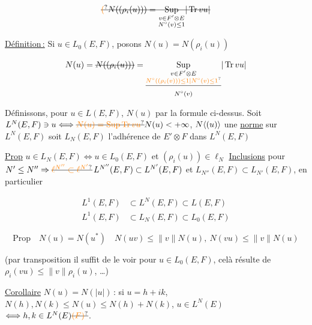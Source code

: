 
\[
\deleted{\unsure{(}N((\rho_i(u)))=\underset{\substack{v\in F'\otimes E\\N^\circ(v)\leq 1}}{\operatorname{Sup}}|\operatorname{Tr}vu|}
\]

\uline{Définition\,:} Si $u\in L_0(E,F)$, posons $N(u)=N(\rho_i(u))$

\[
N(u)=\deleted{N((\rho_i(u)))}=\underset{\substack{v\in F'\otimes E\\\deleted{\unsure{N^\circ((\rho_i(v)))\leq 1|N^\circ(v)\leq1}}\\N^\circ(v)}}{\operatorname{Sup}}|\operatorname{Tr}vu|
\]

Définissons, pour $u\in L(E,F)$, $N(u)$ par la formule ci-dessus. Soit $L^N(E,F)\ni u\Longleftrightarrow\deleted{\unsure{N(u)=\operatorname{Sup}\operatorname{Tr}vu}}N(u)<+\infty$, $N\inserted{(u)}$  une \uline{norme} sur $L^N(E,F)$  soit $L_N(E,F)$ l'adhérence de $E'\otimes F$ dans $L^N(E,F)$

 \uline{Prop} $u\in L_N(E,F)\Longleftrightarrow u\in L_0(E,F)$ et $(\rho_i(u))\in\ell_N$   \uline{Inclusions} pour $N'\leq N''\Rightarrow\deleted{\unsure{\ell^{N''}\subset\ell^{N'}}}\,L^{N''}(E,F)\subset L^{N'}(E,F)$ et $L_{N''}(E,F)\subset L_{N'}(E,F)$, en particulier

\[
\begin{aligned}
L^1(E,F)&\subset L^N(E,F)\subset L(E,F)\\
L^1(E,F)&\subset L_N(E,F)\subset L_0(E,F)
\end{aligned}
\]


\[
\text{Prop}\quad\boxed{N(u)=N(u^*)\quad N(uv)\leq\lVert v\rVert N(u),\ N(vu)\leq\lVert v\rVert N(u)}
\]

 (par transposition il suffit de le voir pour $u\in L_0(E,F)$, celà résulte de $\rho_i(vu)\leq\lVert v\rVert\rho_i(u)$, \ldots)

\uline{Corollaire} $N(u)=N(|u|)$\,: si $u=h+ik$, $N(h),N(k)\leq N(u)\leq N(h)+N(k)$,  $u\in L^N(E)$ \deleted{$\Longleftrightarrow$}$\Longleftrightarrow h,k\in L^N(E)\deleted{\unsure{(F)}}$. 

